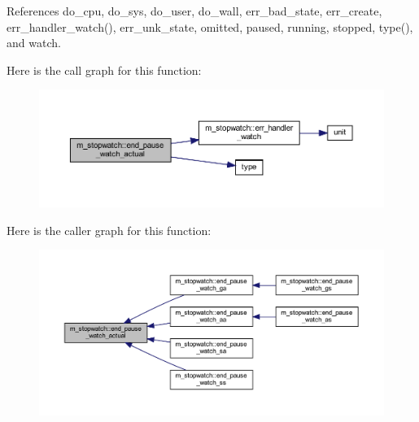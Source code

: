 References do\+\_\+cpu, do\+\_\+sys, do\+\_\+user, do\+\_\+wall, err\+\_\+bad\+\_\+state, err\+\_\+create, err\+\_\+handler\+\_\+watch(), err\+\_\+unk\+\_\+state, omitted, paused, running, stopped, type(), and watch.

Here is the call graph for this function\+:
\nopagebreak
\begin{figure}[H]
\begin{center}
\leavevmode
\includegraphics[width=350pt]{namespacem__stopwatch_a8bbf8dd3f4d63f2047e8bbd51d998a16_cgraph}
\end{center}
\end{figure}
Here is the caller graph for this function\+:
\nopagebreak
\begin{figure}[H]
\begin{center}
\leavevmode
\includegraphics[width=350pt]{namespacem__stopwatch_a8bbf8dd3f4d63f2047e8bbd51d998a16_icgraph}
\end{center}
\end{figure}
\mbox{\label{namespacem__stopwatch_abf357521b2751b550b6097542dadf213}} 
